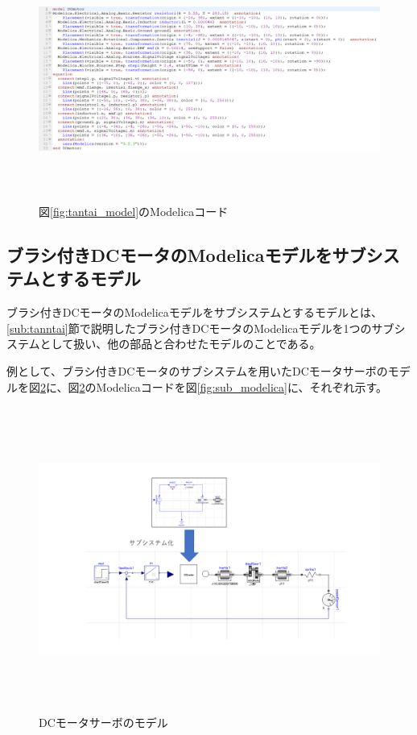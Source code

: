 % 	

\begin{figure}[t]
	\centering
	\includegraphics[width=16.5cm,height=8cm]{./Image/tantai_modelica.png}
	\caption{図\ref{fig:tantai_model}のModelicaコード}
	\label{fig:tantai_modelica}
  \end{figure}


\subsection{ブラシ付きDCモータのModelicaモデルをサブシステムとするモデル} \label{sub:submodel}
ブラシ付きDCモータのModelicaモデルをサブシステムとするモデルとは、
\ref{sub:tanntai}節で説明したブラシ付きDCモータのModelicaモデルを1つのサブシステムとして扱い、他の部品と合わせたモデルのことである。

例として、ブラシ付きDCモータのサブシステムを用いたDCモータサーボのモデルを図\ref{fig:submodel}に、図\ref{fig:submodel}のModelicaコードを図\ref{fig:sub_modelica}に、それぞれ示す。

\begin{figure}[t]
	\centering
	\includegraphics[width=16.5cm,height=10cm]{./Image/submodel_pack.png}
	\caption{DCモータサーボのモデル}
	\label{fig:submodel}
  \end{figure}

